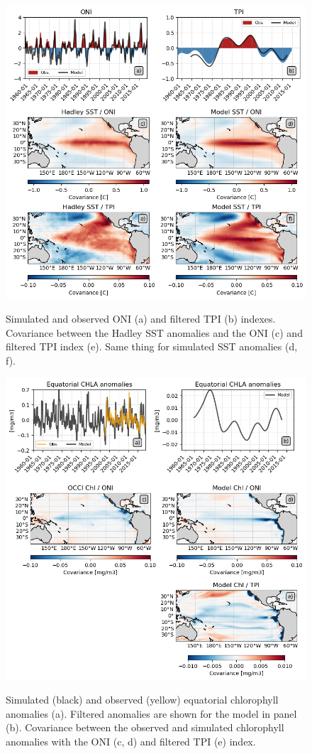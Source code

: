 \begin{figure}[h!]
	\centering
	\includegraphics[scale=0.75] {scripts/final_figs/fig1/fig1.png}
	\label{fig:cov-sst}
	\caption{Simulated and observed ONI (a) and filtered TPI (b) indexes. Covariance between the Hadley SST anomalies and the ONI (c) and filtered TPI index (e). Same thing for simulated SST anomalies (d, f).}
\end{figure}

\begin{figure}[h!]
	\centering
	\includegraphics[scale=0.75] {scripts/final_figs/fig2/fig2.png}
	\label{fig:cov-chl}
	\caption{Simulated (black) and observed (yellow) equatorial chlorophyll anomalies (a). Filtered anomalies are shown for the model in panel (b). Covariance between the observed and simulated chlorophyll anomalies with the ONI (c, d) and filtered TPI (e) index.}
\end{figure}


